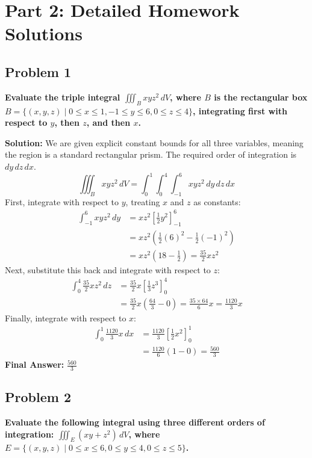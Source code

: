 \documentclass[12pt]{article}
\begin{document}
\newpage
\section{Part 2: Detailed Homework Solutions}

\subsection*{Problem 1}
\textbf{Evaluate the triple integral $\iiint_B xyz^2 \, dV$, where $B$ is the rectangular box $B = \{(x, y, z) \mid 0 \le x \le 1, -1 \le y \le 6, 0 \le z \le 4\}$, integrating first with respect to $y$, then $z$, and then $x$.}

\textbf{Solution:}
We are given explicit constant bounds for all three variables, meaning the region is a standard rectangular prism. The required order of integration is $dy \, dz \, dx$.
\[ \iiint_B xyz^2 \, dV = \int_{0}^{1} \int_{0}^{4} \int_{-1}^{6} xyz^2 \, dy \, dz \, dx \]
First, integrate with respect to $y$, treating $x$ and $z$ as constants:
\begin{align*} 
\int_{-1}^{6} xyz^2 \, dy &= xz^2 \left[ \frac{1}{2}y^2 \right]_{-1}^{6} \\
&= xz^2 \left( \frac{1}{2}(6)^2 - \frac{1}{2}(-1)^2 \right) \\
&= xz^2 \left( 18 - \frac{1}{2} \right) = \frac{35}{2} xz^2 
\end{align*}
Next, substitute this back and integrate with respect to $z$:
\begin{align*} 
\int_{0}^{4} \frac{35}{2} xz^2 \, dz &= \frac{35}{2} x \left[ \frac{1}{3}z^3 \right]_{0}^{4} \\
&= \frac{35}{2} x \left( \frac{64}{3} - 0 \right) = \frac{35 \times 64}{6} x = \frac{1120}{3} x 
\end{align*}
Finally, integrate with respect to $x$:
\begin{align*} 
\int_{0}^{1} \frac{1120}{3} x \, dx &= \frac{1120}{3} \left[ \frac{1}{2}x^2 \right]_{0}^{1} \\
&= \frac{1120}{6} (1 - 0) = \frac{560}{3} 
\end{align*}
\textbf{Final Answer:} $\frac{560}{3}$

\vspace{0.5cm}
\subsection*{Problem 2}
\textbf{Evaluate the following integral using three different orders of integration: $\iiint_E (xy + z^2) \, dV$, where $E = \{(x, y, z) \mid 0 \le x \le 6, 0 \le y \le 4, 0 \le z \le 5\}$.}
\end{document}
